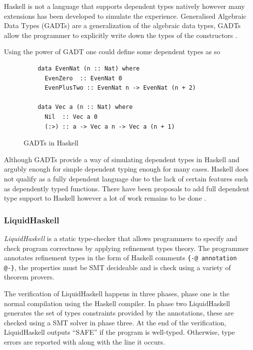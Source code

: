 \documentclass[a4paper,12pt]{report}
\begin{document}
\par
Haskell is not a language that supports dependent types natively however many 
extensions has been developed to simulate the experience. 
Generalised Algebraic Data Types (GADTs) are a generalization of the 
algebraic data types, GADTs allow the programmer to 
explicitly write down the types of the constructors \cite{haskellGADT}. 

\par
Using the power of GADT one could define some dependent types as so

\begin{figure}[H]
  \begin{lstlisting}      
    data EvenNat (n :: Nat) where
      EvenZero  :: EvenNat 0
      EvenPlusTwo :: EvenNat n -> EvenNat (n + 2)
      
    data Vec a (n :: Nat) where
      Nil  :: Vec a 0
      (:>) :: a -> Vec a n -> Vec a (n + 1)
  \end{lstlisting}
  \caption{GADTs in Haskell}
\end{figure}

\par
Although GADTs provide a way of simulating dependent types in Haskell and 
argubly enough for simple dependent typing enough for many cases. 
Haskell does not qualify as a fully dependent 
language due to the lack of certain features such as dependently typed functions. 
There have been proposals to add full dependent type support to Haskell however a lot 
of work remains to be done \cite{dependentHaskell, aRoleForDependentHaskell}. 

\subsubsection{LiquidHaskell}
\textit{LiquidHaskell} \cite{liquidHaskell} 
is a static type-checker that allows programmers to specify and 
check program correctness by applying refinement types theory. The programmer 
annotates refinement types in the form of Haskell comments 
\verb|{-@ annotation @-}|, the properties must be SMT decideable and is check 
using a variety of theorem provers. 

\par
The verification of LiquidHaskell happens in three phases, phase one is the 
normal compilation using the Haskell compiler. In phase two LiquidHaskell 
generates the set of types constraints provided by the annotations, these are 
checked using a SMT solver in phase three. At the end of the verification, 
LiquidHaskell outputs ``SAFE'' if the program is well-typed. Otherwise, 
type errors are reported with along with the line it occurs. 
\end{document}
